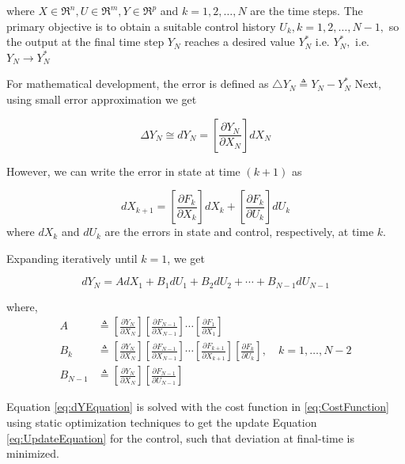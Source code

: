 \documentclass[12pt]{article}
\begin{document}
where $X \in \Re^{n}, U \in \Re^{m}, Y \in \Re^{p}$ and $k=1,2, \ldots, N$ are the time steps. The primary objective is to obtain a suitable control history $U_{k}, k=1,2, \ldots, N-1,$ so the output at the final time step $Y_{N}$ reaches a desired value $Y_{N}^{*}$ i.e. $Y_{N}^{*},$ i.e. $Y_{N} \rightarrow Y_{N}^{*}$

For mathematical development, the error is defined as $  \triangle Y_{N} \triangleq Y_{N}-Y_{N}^{*} $ Next, using small error approximation we get

\begin{equation}
\Delta Y_{N} \cong d Y_{N}=\left[\frac{\partial Y_{N}}{\partial X_{N}}\right] d X_{N}
\end{equation}

However, we can write the error in state at time $ (k+1)$ as

\begin{equation}
d X_{k+1}=\left[\frac{\partial F_{k}}{\partial X_{k}}\right] d X_{k}+\left[\frac{\partial F_{k}}{\partial U_{k}}\right] d U_{k}
\end{equation}
where $d X_{k}$ and $d U_{k}$ are the errors in state and control, respectively, at time $k$.

Expanding iteratively until $k=1$, we get

\begin{equation}
d Y_{N}=A d X_{1}+B_{1} d U_{1}+B_{2} d U_{2}+\cdots+B_{N-1} d U_{N-1}
\label{eq:dYEquation}
\end{equation}

where,
\begin{equation}\begin{aligned}
A & \triangleq\left[\frac{\partial Y_{N}}{\partial X_{N}}\right]\left[\frac{\partial F_{N-1}}{\partial X_{N-1}}\right] \cdots\left[\frac{\partial F_{1}}{\partial X_{1}}\right] \\
B_{k} & \triangleq\left[\frac{\partial Y_{N}}{\partial X_{N}}\right]\left[\frac{\partial F_{N-1}}{\partial X_{N-1}}\right] \cdots\left[\frac{\partial F_{k+1}}{\partial X_{k+1}}\right]\left[\frac{\partial F_{k}}{\partial U_{k}}\right], \quad k=1, \ldots, N-2 \\
B_{N-1} & \triangleq \left[\frac{\partial Y_{N}}{\partial X_{N}}\right]\left[\frac{\partial F_{N-1}}{\partial U_{N-1}}\right]
\end{aligned}\end{equation}

Equation \ref{eq:dYEquation} is solved with the cost function in \ref{eq:CostFunction} using static optimization techniques to get the update Equation \ref{eq:UpdateEquation} for the control, such that deviation at final-time is minimized.
\end{document}
